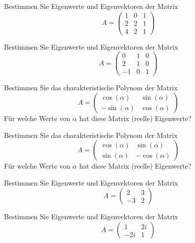\begin{aufgabe} Bestimmen Sie Eigenwerte und Eigenvektoren der Matrix
  	$$ A = \left( \begin{matrix} 1 & 0 & 1 \\ 2 & 2 & 1 \\ 4 & 2 & 1 
     	\end{matrix} \right) $$
\end{aufgabe}

\begin{aufgabe} Bestimmen Sie Eigenwerte und Eigenvektoren der Matrix
  	$$ A = \left( \begin{matrix} 0 & 1 & 0 \\ 2 & 1 & 0 \\ -1 & 0 & 1 
     	\end{matrix} \right) $$
\end{aufgabe}

\begin{aufgabe} Bestimmen Sie das charakteristische Polynom der Matrix
  	$$ A = \left( \begin{matrix} \cos(\alpha) & \sin(\alpha) 
	\\ -\sin(\alpha) & \cos(\alpha) \end{matrix} \right) $$
Für welche Werte von $\alpha$ hat diese Matrix (reelle) Eigenwerte?
\end{aufgabe}

\begin{aufgabe} Bestimmen Sie das charakteristische Polynom der Matrix
  	$$ A = \left( \begin{matrix} \cos(\alpha) & \sin(\alpha) 
	\\ \sin(\alpha) & -\cos(\alpha) \end{matrix} \right) $$
Für welche Werte von $\alpha$ hat diese Matrix (reelle) Eigenwerte?
\end{aufgabe}

\begin{aufgabe} Bestimmen Sie Eigenwerte und Eigenvektoren der Matrix
  	$$ A = \left( \begin{matrix} 2 & 3 \\ -3 & 2 \end{matrix} \right) $$
\end{aufgabe}

\begin{aufgabe} Bestimmen Sie Eigenwerte und Eigenvektoren der Matrix
  	$$ A = \left( \begin{matrix} 1 & 2i \\ -2i & 1 \end{matrix} \right) $$
\end{aufgabe}


